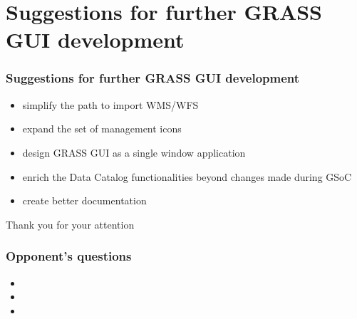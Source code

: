 \documentclass[aspectratio=169]{beamer}
\begin{document}
\section{Suggestions for further GRASS GUI development}
\begin{frame}
\frametitle{Suggestions for further GRASS GUI development}
\begin{itemize}
\item{simplify the path to import WMS/WFS}
\vspace{0.5cm}
\item{expand the set of management icons}
\vspace{0.5cm}
\item{design GRASS GUI as a single window application}
\vspace{0.5cm}
\item{enrich the Data Catalog functionalities beyond changes made during GSoC}
\vspace{0.5cm}
\item{create better documentation}
\end{itemize}
\end{frame}

\begin{frame}
\begin{center}
{\fontsize{20}{40}\selectfont Thank you for your attention}
\end{center}
\end{frame}

\begin{frame}
\frametitle{Opponent's questions}
\begin{itemize}
\item{}
\item{}
\item{}
\end{itemize}
\end{frame}
\end{document}
